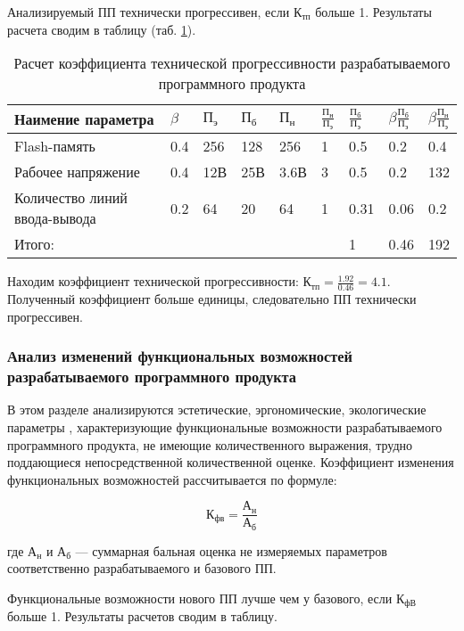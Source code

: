Анализируемый ПП технически прогрессивен, если $\textrm{К}_\textrm{тп}$ больше 1. Результаты
расчета сводим в таблицу (таб. \ref{table:calcKoefTechProgress}).
\begin{table}
\caption{Расчет коэффициента технической прогрессивности разрабатываемого программного продукта}
\begin{tabular}{|p{5cm}|p{1cm}|p{1cm}|p{1cm}|p{1cm}|p{1cm}|p{1cm}|p{1cm}|p{1cm}|}
\hline{}
Наимение параметра &
	$\beta $ &
	$\textrm{П}_\textrm{э}$ &
	$\textrm{П}_\textrm{б}$ &
	$\textrm{П}_\textrm{н}$ &
	$\frac{\textrm{П}_\textrm{н}}{\textrm{П}_\textrm{э}}$ &
	$\frac{\textrm{П}_\textrm{б}}{\textrm{П}_\textrm{э}}$ &
	$\beta \frac{\textrm{П}_\textrm{б}}{\textrm{П}_\textrm{э}}$ &
	$\beta \frac{\textrm{П}_\textrm{н}}{\textrm{П}_\textrm{э}}$ \\
\hline{}
Flash-память & 0.4 & 256 & 128 & 256 & 1 & 0.5 & 0.2 & 0.4 \\
\hline{}
Рабочее напряжение & 0.4 & 12В & 25В & 3.6В & 3& 0.5 & 0.2 & 132 \\
\hline{}
Количество линий ввода-вывода & 0.2 & 64 & 20 & 64 & 1 & 0.31 & 0.06 & 0.2 \\
\hline{}
Итого: & & & & & & 1 & 0.46 & 192 \\
\hline
\end{tabular}
\label{table:calcKoefTechProgress}
\end{table}               
Находим коэффициент технической прогрессивности: $\textrm{К}_\textrm{тп} = \frac{1.92}{0.46} = 4.1$.
Полученный коэффициент больше единицы, следовательно ПП технически прогрессивен.



\subsubsection{Анализ изменений функциональных возможностей разрабатываемого программного продукта}
\begin{par}
В этом разделе анализируются  эстетические, эргономические,
экологические параметры , характеризующие функциональные возможности 
разрабатываемого программного продукта, не имеющие количественного 
выражения, трудно поддающиеся непосредственной количественной оценке.
Коэффициент изменения функциональных возможностей рассчитывается
по  формуле:
\end{par}


\begin{equation}
	\textrm{К}_\textrm{фв} = \frac{\textrm{А}_\textrm{н}}{\textrm{А}_\textrm{б}}
\end{equation}
\begin{ESKDexplanation}
	\item[где ]{} $\textrm{А}_\textrm{н}$ и $\textrm{А}_\textrm{б}$ --- суммарная бальная оценка не измеряемых параметров соответственно разрабатываемого и базового ПП.
\end{ESKDexplanation}
Функциональные возможности нового ПП лучше чем у базового, если $\textrm{К}_\textrm{фВ}$  больше 1.
Результаты расчетов сводим в таблицу.

